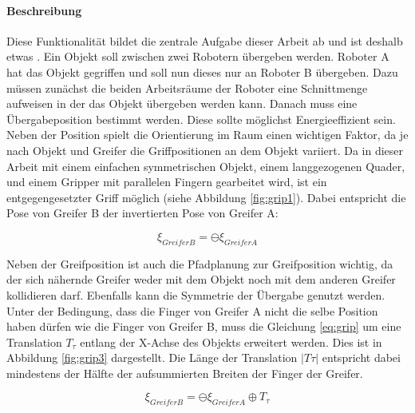 \paragraph{Beschreibung}
Diese Funktionalität bildet die zentrale Aufgabe dieser Arbeit ab und ist deshalb etwas . Ein Objekt soll zwischen zwei Robotern übergeben werden. Roboter A hat das Objekt gegriffen und soll nun dieses nur an Roboter B übergeben. Dazu müssen zunächst die beiden Arbeitsräume der Roboter eine Schnittmenge aufweisen in der das Objekt übergeben werden kann. Danach muss eine Übergabeposition bestimmt werden. Diese sollte möglichst Energieeffizient sein. Neben der Position spielt die Orientierung im Raum einen wichtigen Faktor, da je nach Objekt und Greifer die Griffpositionen an dem Objekt variiert. Da in dieser Arbeit mit einem einfachen symmetrischen Objekt, einem langgezogenen Quader, und einem Gripper mit parallelen Fingern gearbeitet wird, ist ein entgegengesetzter Griff möglich (siehe Abbildung \ref{fig:grip1}). Dabei entspricht die Pose von Greifer B der invertierten Pose von Greifer A:

\begin{equation}
\xi_{GreiferB} = \ominus \xi_{GreiferA}
\label{eq:grip}
\end{equation}


Neben der Greifposition ist auch die Pfadplanung zur Greifposition wichtig, da der sich nähernde Greifer weder mit dem Objekt noch mit dem anderen Greifer kollidieren darf. Ebenfalls kann die Symmetrie der Übergabe genutzt werden. Unter der Bedingung, dass die Finger von Greifer A nicht die selbe Position haben dürfen wie die Finger von Greifer B, muss die Gleichung \ref{eq:grip} um eine Translation $T_\tau$ entlang der X-Achse des Objekts erweitert werden. Dies ist in Abbildung \ref{fig:grip3} dargestellt. Die Länge der Translation $|T\tau|$ entspricht dabei mindestens der Hälfte der aufsummierten Breiten der Finger der Greifer.

\begin{equation}
\xi_{GreiferB} = \ominus \xi_{GreiferA} \oplus T_\tau
\label{eq:grip2}
\end{equation}

